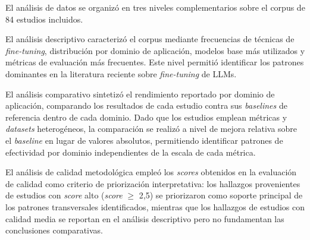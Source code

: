El análisis de datos se organizó en tres niveles complementarios sobre el corpus de 84 estudios incluidos.

El análisis descriptivo caracterizó el corpus mediante frecuencias de técnicas de \textit{fine-tuning}, distribución por dominio de aplicación, modelos base más utilizados y métricas de evaluación más frecuentes. Este nivel permitió identificar los patrones dominantes en la literatura reciente sobre \textit{fine-tuning} de LLMs.

El análisis comparativo sintetizó el rendimiento reportado por dominio de aplicación, comparando los resultados de cada estudio contra sus \textit{baselines} de referencia dentro de cada dominio. Dado que los estudios emplean métricas y \textit{datasets} heterogéneos, la comparación se realizó a nivel de mejora relativa sobre el \textit{baseline} en lugar de valores absolutos, permitiendo identificar patrones de efectividad por dominio independientes de la escala de cada métrica.

El análisis de calidad metodológica empleó los \textit{scores} obtenidos en la evaluación de calidad como criterio de priorización interpretativa: los hallazgos provenientes de estudios con \textit{score} alto (\textit{score} $\geq$ 2,5) se priorizaron como soporte principal de los patrones transversales identificados, mientras que los hallazgos de estudios con calidad media se reportan en el análisis descriptivo pero no fundamentan las conclusiones comparativas.